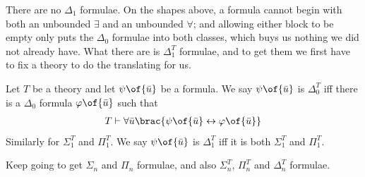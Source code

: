There are no $\Delta_1$ formulae. On the shapes above, a formula cannot begin with both an unbounded $\exists$ and an unbounded $\forall$; and allowing either block to be empty only puts the $\Delta_0$ formulae into both classes, which buys us nothing we did not already have. What there are is $\Delta_1^T$ formulae, and to get them we first have to fix a theory to do the translating for us.

\begin{boxdefinition}
    Let $T$ be a theory and let $\psi\of{\bar{u}}$ be a formula. We say $\psi\of{\bar{u}}$ is $\Delta_0^T$ iff there is a $\Delta_0$ formula $\varphi\of{\bar{u}}$ such that
    \begin{align*}
        T \vdash \forall \bar{u} \brac{\psi\of{\bar{u}} \leftrightarrow \varphi\of{\bar{u}}}
    \end{align*}
    Similarly for $\Sigma_1^T$ and $\Pi_1^T$. We say $\psi\of{\bar{u}}$ is $\Delta_1^T$ iff it is both $\Sigma_1^T$ and $\Pi_1^T$.
\end{boxdefinition}

Keep going to get $\Sigma_n$ and $\Pi_n$ formulae, and also $\Sigma_n^T$, $\Pi_n^T$ and $\Delta_n^T$ formulae.
